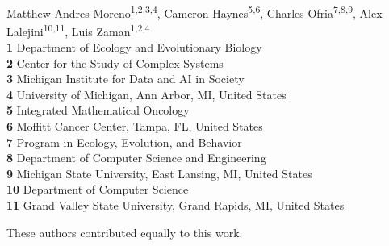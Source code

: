 \begin{flushleft}
{\Large
\textbf{} %
}
{\large
\textit{} %
}
\newline
\\
Matthew Andres Moreno\textsuperscript{1,2,3,4\Yinyang*},
Cameron Haynes\textsuperscript{5,6\Yinyang},
Charles Ofria\textsuperscript{7,8,9},
Alex Lalejini\textsuperscript{10,11\ddag},
Luis Zaman\textsuperscript{1,2,4\ddag}
\\
\bigskip
\textbf{1} Department of Ecology and Evolutionary Biology\\
\textbf{2} Center for the Study of Complex Systems\\
\textbf{3} Michigan Institute for Data and AI in Society\\
\textbf{4} University of Michigan, Ann Arbor, MI, United States\\
\textbf{5} Integrated Mathematical Oncology\\
\textbf{6} Moffitt Cancer Center, Tampa, FL, United States\\
\textbf{7} Program in Ecology, Evolution, and Behavior\\
\textbf{8} Department of Computer Science and Engineering\\
\textbf{9} Michigan State University, East Lansing, MI, United States\\
\textbf{10} Department of Computer Science\\
\textbf{11} Grand Valley State University, Grand Rapids, MI, United States\\
\bigskip

%
%
\Yinyang These authors contributed equally to this work.


\end{flushleft}

